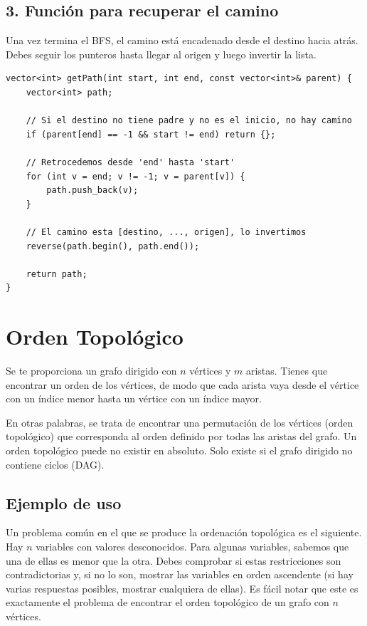 \subsection*{3. Función para recuperar el camino}

Una vez termina el BFS, el camino está encadenado desde el destino hacia atrás. Debes seguir los punteros hasta llegar al origen y luego invertir la lista.

\begin{lstlisting}[caption=Función para reconstruir el camino]
vector<int> getPath(int start, int end, const vector<int>& parent) {
	vector<int> path;
	
	// Si el destino no tiene padre y no es el inicio, no hay camino
	if (parent[end] == -1 && start != end) return {};

	// Retrocedemos desde 'end' hasta 'start'
	for (int v = end; v != -1; v = parent[v]) {
		path.push_back(v);
	}
	
	// El camino esta [destino, ..., origen], lo invertimos
	reverse(path.begin(), path.end());
	
	return path;
}
\end{lstlisting}

\section{Orden Topológico}

Se te proporciona un grafo dirigido con $n$ vértices y $m$ aristas. Tienes que encontrar un orden de los vértices, de modo que cada arista vaya desde el vértice con un índice menor hasta un vértice con un índice mayor.

En otras palabras, se trata de encontrar una permutación de los vértices (orden topológico) que corresponda al orden definido por todas las aristas del grafo. Un orden topológico puede no existir en absoluto. Solo existe si el grafo dirigido no contiene ciclos (DAG).

\subsection*{Ejemplo de uso}

Un problema común en el que se produce la ordenación topológica es el siguiente. Hay $n$ variables con valores desconocidos. Para algunas variables, sabemos que una de ellas es menor que la otra. Debes comprobar si estas restricciones son contradictorias y, si no lo son, mostrar las variables en orden ascendente (si hay varias respuestas posibles, mostrar cualquiera de ellas). Es fácil notar que este es exactamente el problema de encontrar el orden topológico de un grafo con $n$ vértices.

